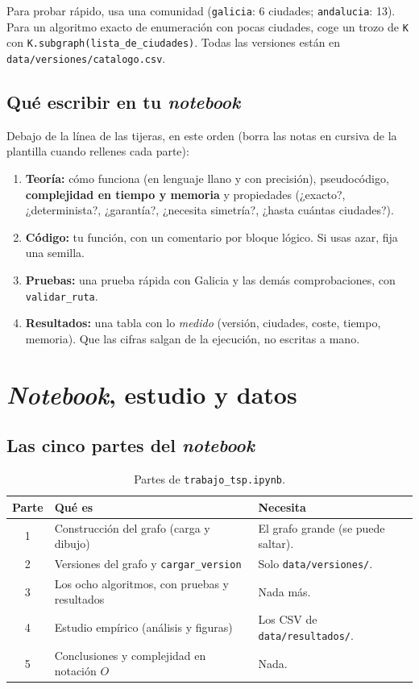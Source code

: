 \documentclass[11pt,a4paper,twoside,openany]{report}
\begin{document}
Para probar rápido, usa una comunidad (\texttt{galicia}: 6 ciudades; \texttt{andalucia}: 13). Para un algoritmo exacto de enumeración con pocas ciudades, coge un trozo de \texttt{K} con \texttt{K.subgraph(lista\_de\_ciudades)}. Todas las versiones están en \texttt{data/versiones/catalogo.csv}.

\section{Qué escribir en tu \emph{notebook}}

Debajo de la línea de las tijeras, en este orden (borra las notas en cursiva de la plantilla cuando rellenes cada parte):
\begin{enumerate}[label=\textbf{\arabic*.}]
  \item \textbf{Teoría:} cómo funciona (en lenguaje llano y con precisión), pseudocódigo, \textbf{complejidad en tiempo y memoria} y propiedades (¿exacto?, ¿determinista?, ¿garantía?, ¿necesita simetría?, ¿hasta cuántas ciudades?).
  \item \textbf{Código:} tu función, con un comentario por bloque lógico. Si usas azar, fija una semilla.
  \item \textbf{Pruebas:} una prueba rápida con Galicia y las demás comprobaciones, con \texttt{validar\_ruta}.
  \item \textbf{Resultados:} una tabla con lo \emph{medido} (versión, ciudades, coste, tiempo, memoria). Que las cifras salgan de la ejecución, no escritas a mano.
\end{enumerate}

\chapter{\emph{Notebook}, estudio y datos}\label{g:notebook}

\section{Las cinco partes del \emph{notebook}}

\begin{table}[htbp]
  \centering
  \caption{Partes de \texttt{trabajo\_tsp.ipynb}.}
  \small
  \begin{tabularx}{\linewidth}{@{}c l X@{}}
    \toprule
    Parte & Qué es & Necesita \\
    \midrule
    1 & Construcción del grafo (carga y dibujo) & El grafo grande (se puede saltar). \\
    2 & Versiones del grafo y \texttt{cargar\_version} & Solo \texttt{data/versiones/}. \\
    3 & Los ocho algoritmos, con pruebas y resultados & Nada más. \\
    4 & Estudio empírico (análisis y figuras) & Los CSV de \texttt{data/resultados/}. \\
    5 & Conclusiones y complejidad en notación $O$ & Nada. \\
    \bottomrule
  \end{tabularx}
\end{table}
\end{document}
